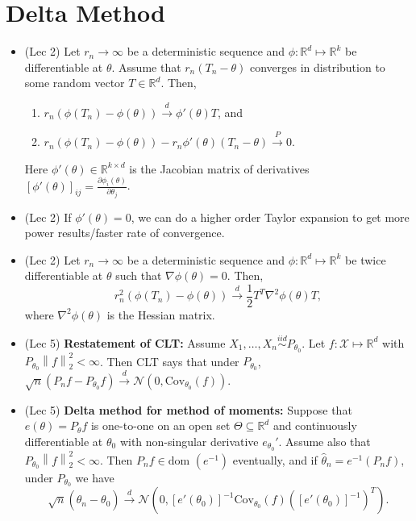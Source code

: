 \documentclass[twoside]{article}
\newcommand{\dis}{\displaystyle}
\newcommand{\norm}[1]{\left\|{#1}\right\|} %
\newcommand{\ltwo}[1]{\norm{#1}_2} %
\newcommand\bbR{\mathbb{R}}
\newcommand\calN{\mathcal{N}}
\newcommand\calX{\mathcal{X}}
\def\t{\theta}
\newcommand\T{\Theta}
\newcommand\cd{\stackrel{d}{\goesto}}
\newcommand\cp{\stackrel{P}{\goesto}}
\newcommand\goesto{\rightarrow}
\begin{document}
\section{Delta Method}
\begin{itemize}
\item (Lec 2) Let $r_n \goesto \infty$ be a deterministic sequence and $\phi:\bbR^d \mapsto \bbR^k$ be differentiable at $\t$. Assume that $r_n (T_n - \t)$ converges in distribution to some random vector $T \in \bbR^d$. Then, 
\begin{enumerate}
\item $r_n(\phi(T_n) - \phi(\t)) \cd\phi'(\t)T$, and
\item $r_n(\phi(T_n) - \phi(\t)) - r_n\phi'(\t)(T_n - \t) \cp 0$.
\end{enumerate}
Here $\phi'(\theta) \in \bbR^{k \times d}$ is the Jacobian matrix of derivatives $[\phi'(\theta)]_{ij} = \dis\frac{\partial\phi_i(\theta)}{\partial \theta_j}$.

\item (Lec 2) If $\phi'(\t) = 0$, we can do a higher order Taylor expansion to get more power results/faster rate of convergence.

\item (Lec 2) Let $r_n \goesto \infty$ be a deterministic sequence and $\phi:\bbR^d \mapsto \bbR^k$ be twice differentiable at $\t$ such that $\nabla \phi(\theta)=0$. Then,
$$r_n^2 (\phi(T_n) - \phi(\theta)) \cd \frac{1}{2}T^T\nabla^2 \phi(\theta)T,$$
where $\nabla^2 \phi(\theta)$ is the Hessian matrix.

\item (Lec 5) \textbf{Restatement of CLT:} Assume $X_1, \dots, X_n \stackrel{iid}{\sim} P_{\t_0}$. Let $f: \calX \mapsto \bbR^d$ with $P_{\t_0} \ltwo{f}^2 < \infty$. Then CLT says that under $P_{\t_0}$, $\sqrt{n}(P_n f - P_{\t_0} f) \cd \calN \left( 0, \text{Cov}_{\t_0} (f) \right)$.

\item (Lec 5) \textbf{Delta method for method of moments:} Suppose that $e(\t) = P_\t f$ is one-to-one on an open set $\T \subseteq \bbR^d$ and continuously differentiable at $\t_0$ with non-singular derivative $e_{\t_0}'$. Assume also that $P_{\t_0}\ltwo{f}^2 < \infty$. Then $P_n f \in \text{dom }(e^{-1})$ eventually, and if $\hat{\t}_n = e^{-1}(P_n f)$, under $P_{\t_0}$ we have 
\[\sqrt{n}(\hat{\t}_n - \t_0) \cd \calN \left( 0, [e'(\t_0)]^{-1} \text{Cov}_{\t_0}(f) ([e'(\t_0)]^{-1})^T \right). \]

\end{itemize}
\end{document}
